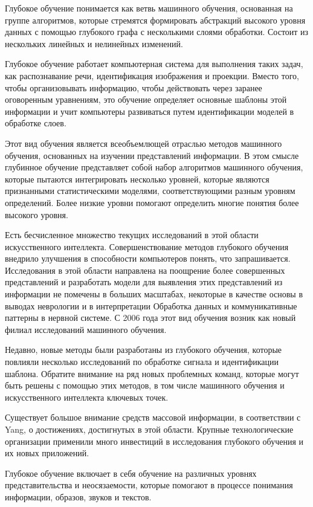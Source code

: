 Глубокое обучение понимается как ветвь машинного обучения, основанная на группе алгоритмов,
которые стремятся формировать абстракций высокого уровня
данных с помощью глубокого графа с несколькими слоями обработки.
Состоит из нескольких линейных и нелинейных изменений.

Глубокое обучение работает компьютерная система для выполнения таких задач,
как распознавание речи, идентификация изображения и проекции.
Вместо того, чтобы организовывать информацию, чтобы действовать через заранее оговоренным уравнениям,
это обучение определяет основные шаблоны этой информации и
учит компьютеры развиваться путем идентификации моделей в обработке слоев.

Этот вид обучения является всеобъемлющей отраслью методов машинного обучения,
основанных на изучении представлений информации.
В этом смысле глубинное обучение представляет собой набор алгоритмов машинного обучения,
которые пытаются интегрировать несколько уровней,
которые являются признанными статистическими моделями, соответствующими разным уровням определений.
Более низкие уровни помогают определить многие понятия более высокого уровня.

Есть бесчисленное множество текущих исследований в этой области искусственного интеллекта.
Совершенствование методов глубокого обучения внедрило улучшения в способности компьютеров понять, что запрашивается.
Исследования в этой области направлена на поощрение более совершенных представлений и
разработать модели для выявления этих представлений из информации не помечены в больших масштабах,
некоторые в качестве основы в выводах неврологии и в интерпретации Обработка данных и
коммуникативные паттерны в нервной системе.
С 2006 года этот вид обучения возник как новый филиал исследований машинного обучения.

Недавно, новые методы были разработаны из глубокого обучения,
которые повлияли несколько исследований по обработке сигнала и идентификации шаблона.
Обратите внимание на ряд новых проблемных команд, которые могут быть решены с помощью этих методов,
в том числе машинного обучения и искусственного интеллекта ключевых точек.

Существует большое внимание средств массовой информации,
в соответствии с Yang, о достижениях, достигнутых в этой области.
Крупные технологические организации применили много инвестиций
в исследования глубокого обучения и их новых приложений.

Глубокое обучение включает в себя обучение на различных уровнях представительства и неосязаемости,
которые помогают в процессе понимания информации, образов, звуков и текстов.

